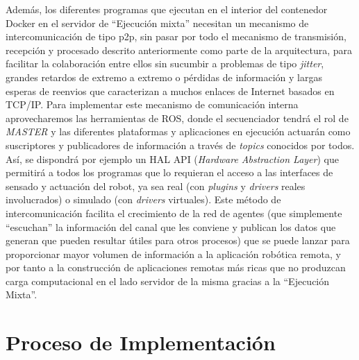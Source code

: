 Además, los diferentes programas que ejecutan en el interior del contenedor Docker en el servidor de ``Ejecución mixta'' necesitan un mecanismo de intercomunicación de tipo p2p, sin pasar por todo el mecanismo de transmisión, recepción y procesado descrito anteriormente como parte de la arquitectura, para facilitar la colaboración entre ellos sin sucumbir a problemas de tipo \textit{jitter}, grandes retardos de extremo a extremo o pérdidas de información y largas esperas de reenvios que caracterizan a muchos enlaces de Internet basados en TCP/IP. Para implementar este mecanismo de comunicación interna aprovecharemos las herramientas de ROS, donde el secuenciador tendrá el rol de \textit{MASTER} y las diferentes plataformas y aplicaciones en ejecución actuarán como suscriptores y publicadores de información a través de \textit{topics} conocidos por todos. Así, se dispondrá por ejemplo un HAL API (\textit{Hardware Abstraction Layer}) que permitirá a todos los programas que lo requieran el acceso a las interfaces de sensado y actuación del robot, ya sea real (con \textit{plugins} y \textit{drivers} reales involucrados) o simulado (con \textit{drivers} virtuales). Este método de intercomunicación facilita el crecimiento de la red de agentes (que simplemente ``escuchan'' la información del canal que les conviene y publican los datos que generan que pueden resultar útiles para otros procesos) que se puede lanzar para proporcionar mayor volumen de información a la aplicación robótica remota, y por tanto a la construcción de aplicaciones remotas más ricas que no produzcan carga computacional en el lado servidor de la misma gracias a la ``Ejecución Mixta''.

\section{Proceso de Implementación}

